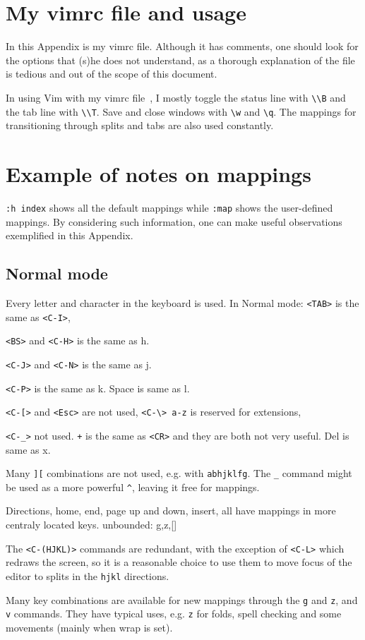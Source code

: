 \documentclass{article}
\newcommand{\ttt}[1] {
	\texttt{<#1>}}
\newcommand{\tttt}[1]{\texttt{#1}}
\begin{document}
\section{My vimrc file and usage}
In this Appendix is my vimrc file.
Although it has comments, one should
look for the options that (s)he does
not understand, as a thorough explanation
of the file is tedious and out of the scope
of this document.

In using Vim with my vimrc file~\cite{vimrc},
I mostly toggle the status line with \texttt{\textbackslash\textbackslash B}
and the tab line with \texttt{\textbackslash\textbackslash T}.
Save and close windows with \texttt{\textbackslash w} and \texttt{\textbackslash q}.
The mappings for transitioning through splits and tabs
are also used constantly.

\section{Example of notes on mappings}\label{notes}
\texttt{:h index} shows all the default mappings
while \tttt{:map} shows the user-defined mappings.
By considering such information, one can make
useful observations exemplified in this Appendix.

\subsection{Normal mode}
Every letter and character in the keyboard is used.
In Normal mode: \ttt{TAB} is the same as \ttt{C-I},
\ttt{BS} and \ttt{C-H} is the same as h.
\ttt{C-J} and \ttt{C-N} is the same as j.
\ttt{C-P} is the same as k.
Space is same as l.
\ttt{C-[} and \ttt{Esc} are not used,
\tttt{<C-\textbackslash> a-z} is reserved for extensions,
\ttt{C-\_} not used.
\tttt{+} is the same as \ttt{CR} and they are both not very useful.
Del is same as x.

Many \tttt{][} combinations are not used, e.g.
with \tttt{abhjklfg}.
The \tttt{\_} command might be used as a more powerful \tttt{\^},
leaving it free for mappings.

Directions, home, end, page up and down, insert, all have mappings
in more centraly located keys.
unbounded: g,z,[]

The \ttt{C-(HJKL)} commands are redundant,
with the exception of \ttt{C-L} which redraws the screen,
so it is a reasonable choice to use them to move focus
of the editor to splits in the \tttt{hjkl} directions.

Many key combinations are available for new mappings through the \tttt{g}
and \tttt{z}, and \tttt{v} commands.
They have typical uses, e.g. \tttt{z} for folds,
spell checking and some movements (mainly when wrap is set).
\end{document}
